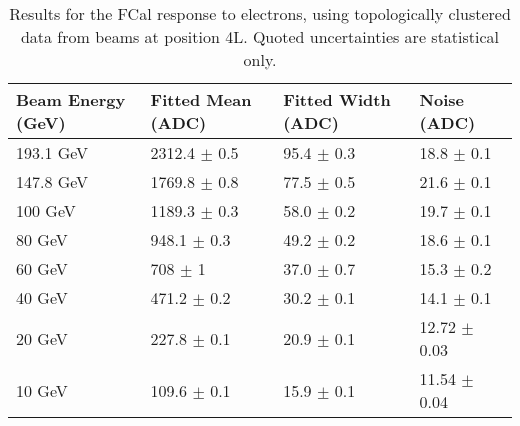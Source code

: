\begin{table}[b]
\begin{center}
\begin{tabular}{|l|l|l|l|}
\hline
Beam Energy (GeV) & Fitted Mean (ADC)& Fitted Width (ADC)& Noise (ADC) \\
\hline
193.1 GeV  &  2312.4 $\pm$     0.5 &    95.4 $\pm$     0.3 &    18.8 $\pm$     0.1 \\
147.8 GeV  &  1769.8 $\pm$     0.8 &    77.5 $\pm$     0.5 &    21.6 $\pm$     0.1 \\
100 GeV  &  1189.3 $\pm$     0.3 &    58.0 $\pm$     0.2 &    19.7 $\pm$     0.1 \\
80 GeV  &   948.1 $\pm$     0.3 &    49.2 $\pm$     0.2 &    18.6 $\pm$     0.1 \\
60 GeV  &   708 $\pm$     1 &    37.0 $\pm$     0.7 &    15.3 $\pm$     0.2 \\
40 GeV  &   471.2 $\pm$     0.2 &    30.2 $\pm$     0.1 &    14.1 $\pm$     0.1 \\
20 GeV  &   227.8 $\pm$     0.1 &    20.9 $\pm$     0.1 &    12.72 $\pm$     0.03 \\
10 GeV  &   109.6 $\pm$     0.1 &    15.9 $\pm$     0.1 &    11.54 $\pm$     0.04 \\
\hline
\end{tabular}
\end{center}
\caption[Electron response at 4L, topoclusters]{Results for the FCal response to electrons, using topologically clustered data from beams at position 4L. Quoted uncertainties are statistical only.}
\label{table_electron_response_4L_t420}
\end{table}

